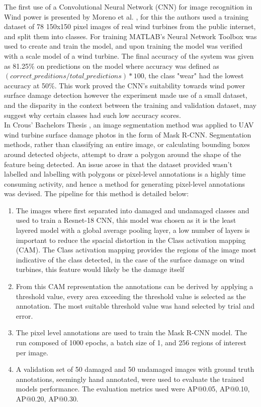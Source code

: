 \documentclass[conference]{IEEEtran}
\begin{document}
The first use of a Convolutional Neural Network (CNN) for image recognition in Wind power is presented by Moreno et al. \cite{moreno2018new}, for this the authors used a training dataset of 78 150x150 pixel images of real wind turbines from the public internet, and split them into classes. For training MATLAB's Neural Network Toolbox was used to create and train the model, and upon training the model was verified with a scale model of a wind turbine. The final accuracy of the system was given as 81.25\% on predictions on the model where accuracy was defined as $(correct\_preditions/total\_predictions)*100$, the class "wear" had the lowest accuracy at 50\%. This work proved the CNN's suitability towards wind power surface damage detection however the experiment made use of a small dataset, and the disparity in the context between the training and validation dataset, may suggest why certain classes had such low accuracy scores. \\
In Crous' Bachelors Thesis \cite{crous2018combining}, an image segmentation method was applied to UAV wind turbine surface damage photos in the form of Mask R-CNN. Segmentation methods, rather than classifying an entire image, or calculating bounding boxes around detected objects, attempt to draw a polygon around the shape of the feature being detected. An issue arose in that the dataset provided wasn't labelled and labelling with polygons or pixel-level annotations is a highly time consuming activity, and hence a method for generating pixel-level annotations was devised. The pipeline for this method is detailed below:
\begin{enumerate}
    \item The images where first separated into damaged and undamaged classes and used to train a Resnet-18 CNN, this model was chosen as it is the least layered model with a global average pooling layer, a low number of layers is important to reduce the spacial distortion in the Class activation mapping (CAM). The Class activation mapping provides the regions of the image most indicative of the class detected, in the case of the surface damage on wind turbines, this feature would likely be the damage itself
    \item From this CAM representation the annotations can be derived by applying a threshold value, every area exceeding the threshold value is selected as the annotation. The most suitable threshold value was hand selected by trial and error.
    \item The pixel level annotations are used to train the Mask R-CNN model. The run composed of 1000 epochs, a batch size of 1, and 256 regions of interest per image. 
    \item A validation set of 50 damaged and 50 undamaged images with ground truth annotations, seemingly hand annotated, were used to evaluate the trained models performance. The evaluation metrics used were AP@0.05, AP@0.10, AP@0.20, AP@0.30.
\end{enumerate}
\end{document}
